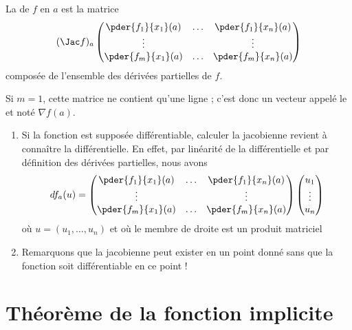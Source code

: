 \begin{definition}La  de $f$ en $a$ est la matrice
  \begin{equation*}
    (\Jac f)_a \begin{pmatrix}
      \pder {f_1} {x_1}(a) & \ldots &\pder {f_1} {x_n}(a)\\
      \vdots& & \vdots\\
      \pder {f_m} {x_1}(a) & \ldots &\pder {f_m} {x_n}(a)
    \end{pmatrix}
  \end{equation*}
  composée de l'ensemble des dérivées partielles de $f$.

  Si $m = 1$, cette matrice ne contient qu'une ligne ; c'est donc un
  vecteur appelé le  et noté $\nabla f(a)$.
\end{definition}

\begin{remark}
  \begin{enumerate}
  \item Si la fonction est supposée différentiable, calculer la
    jacobienne revient à connaître la différentielle. En effet, par
    linéarité de la différentielle et par définition des dérivées
    partielles, nous avons
    \begin{equation*}
      d f_a (u) =%
      \begin{pmatrix}
        \pder {f_1} {x_1}(a) & \ldots &\pder {f_1} {x_n}(a)\\
        \vdots& & \vdots\\
        \pder {f_m} {x_1}(a) & \ldots &\pder {f_m} {x_n}(a)
      \end{pmatrix}
      \begin{pmatrix}u_1\\\vdots\\u_n\end{pmatrix}
    \end{equation*}
    où $u = (u_1, \ldots, u_n)$ et où le membre de droite est un
    produit matriciel

  \item Remarquons que la jacobienne peut exister en un point donné
    sans que la fonction soit différentiable en ce point !
  \end{enumerate}
\end{remark}

					\section{Théorème de la fonction implicite}

